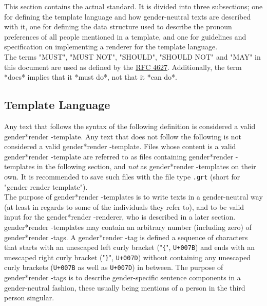 \documentclass{article}
\newcommand{\GenderRender}{
    gender*render
}
\begin{document}
    This section contains the actual standard.
    It is divided into three subsections;
    one for defining the template language and how gender-neutral texts are described with it,
    one for defining the data structure used to describe the pronoun preferences of all people mentioned in a template,
    and one for guidelines and specification on implementing a renderer for the template language.\\

    The terms "MUST", "MUST NOT", "SHOULD", "SHOULD NOT" and "MAY" in this document are used as defined by the \href{https://tools.ietf.org/html/rfc2119}{RFC 4627}.
    Additionally, the term *does* implies that it *must do*, not that it *can do*.

    \subsection{Template Language}

    Any text that follows the syntax of the following definition is considered a valid \GenderRender-template.
    Any text that does not follow the following is not considered a valid \GenderRender-template.
    Files whose content is a valid \GenderRender-template are referred to as files containing \GenderRender-templates in the following section, and \emph{not} as \GenderRender-templates on their own.
    It is recommended to save such files with the file type \texttt{.grt} (short for "gender render template").\\

    The purpose of \GenderRender-templates is to write texts in a gender-neutral way (at least in regards to some of the individuals they refer to), and to be valid input for the \GenderRender-renderer, who is described in a later section.\\

    \GenderRender-templates may contain an arbitrary number (including zero) of \GenderRender-tags.
    A \GenderRender-tag is defined a sequence of characters that starts with an unescaped left curly bracket ("\texttt{\{}", \texttt{U+007B}) and ends with an unescaped right curly bracket ("\texttt{\}}", \texttt{U+007D}) without containing any unescaped curly brackets (\texttt{U+007B} as well as \texttt{U+007D}) in between.
    The purpose of \GenderRender-tags is to describe gender-specific sentence components in a gender-neutral fashion, these usually being mentions of a person in the third person singular.\\
\end{document}
